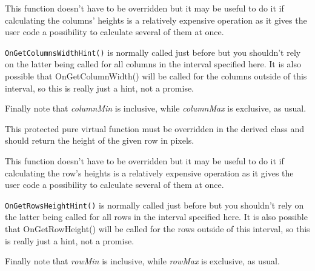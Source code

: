 
This function doesn't have to be overridden but it may be useful to do
it if calculating the columns' heights is a relatively expensive operation
as it gives the user code a possibility to calculate several of them at
once.

{\tt OnGetColumnsWidthHint()} is normally called just before 
 but you
shouldn't rely on the latter being called for all columns in the interval
specified here. It is also possible that OnGetColumnWidth() will be
called for the columns outside of this interval, so this is really just a
hint, not a promise.

Finally note that {\it columnMin} is inclusive, while {\it columnMax} is exclusive,
as usual.


\label{wxhvscrolledwindowongetrowheight}


This protected pure virtual function must be overridden in the derived class
and should return the height of the given row in pixels.




\label{wxhvscrolledwindowongetrowsheighthint}


This function doesn't have to be overridden but it may be useful to do
it if calculating the row's heights is a relatively expensive operation
as it gives the user code a possibility to calculate several of them at
once.

{\tt OnGetRowsHeightHint()} is normally called just before 
 but you
shouldn't rely on the latter being called for all rows in the interval
specified here. It is also possible that OnGetRowHeight() will be
called for the rows outside of this interval, so this is really just a
hint, not a promise.

Finally note that {\it rowMin} is inclusive, while {\it rowMax} is exclusive,
as usual.


\label{wxhvscrolledwindowrefreshcolumn}

